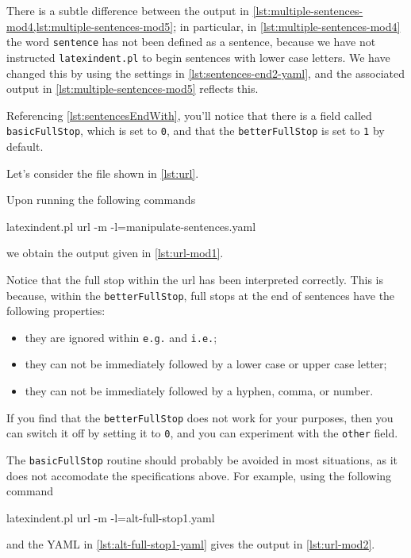 	There is a subtle difference between the output in \cref{lst:multiple-sentences-mod4,lst:multiple-sentences-mod5}; in
	particular, in \cref{lst:multiple-sentences-mod4} the word \texttt{sentence} has not
	been defined as a sentence, because we have not instructed \texttt{latexindent.pl} to
	begin sentences with lower case letters. We have changed this by using the settings in
	\cref{lst:sentences-end2-yaml}, and the associated output in \cref{lst:multiple-sentences-mod5}
	reflects this.

	Referencing \vref{lst:sentencesEndWith}, you'll notice that there is a field called
	\texttt{basicFullStop}, which is set to \texttt{0}, and that the
	\texttt{betterFullStop} is set to \texttt{1} by default.

	Let's consider the file shown in \cref{lst:url}.


	Upon running the following commands
	\begin{commandshell}
latexindent.pl url -m -l=manipulate-sentences.yaml
\end{commandshell}
	we obtain the output given in \cref{lst:url-mod1}.


	Notice that the full stop within the url has been interpreted correctly. This is because,
	within the \texttt{betterFullStop}, full stops at the end of sentences have the
	following properties:
	\begin{itemize}
		\item they are ignored within \texttt{e.g.} and \texttt{i.e.};
		\item they can not be immediately followed by a lower case or upper case letter;
		\item they can not be immediately followed by a hyphen, comma, or number.
	\end{itemize}
	If you find that the \texttt{betterFullStop} does not work for your purposes, then
	you can switch it off by setting it to \texttt{0}, and you can
	experiment with the \texttt{other} field.

	The \texttt{basicFullStop} routine should probably be avoided in most situations, as
	it does not accomodate the specifications above. For example, using the following command
	\begin{commandshell}
latexindent.pl url -m -l=alt-full-stop1.yaml
\end{commandshell}
	and the YAML in \cref{lst:alt-full-stop1-yaml} gives the output in
	\cref{lst:url-mod2}.

